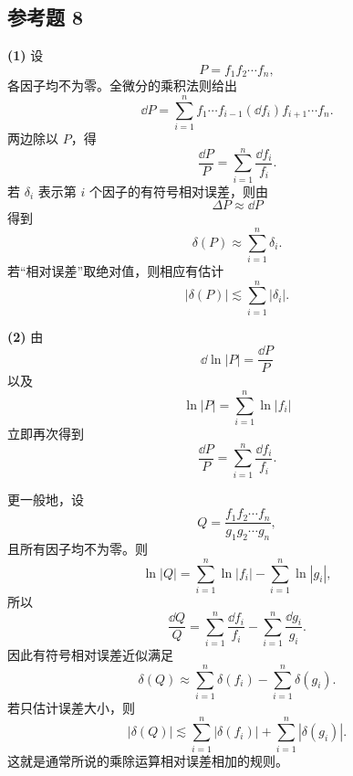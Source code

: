 \subsection*{参考题 8}
\begin{xsolution}
\textbf{(1)} 设
\[
  P=f_1f_2\cdots f_n,
\]
各因子均不为零。全微分的乘积法则给出
\[
  \dd P
  =\sum_{i=1}^n
    f_1\cdots f_{i-1}(\dd f_i)f_{i+1}\cdots f_n.
\]
两边除以 $P$，得
\[
  \frac{\dd P}{P}
  =\sum_{i=1}^n\frac{\dd f_i}{f_i}.
\]
若 $\delta_i$ 表示第 $i$ 个因子的有符号相对误差，则由
\[
  \Delta P\approx\dd P
\]
得到
\[
  \boxed{
  \delta(P)\approx\sum_{i=1}^n\delta_i}.
\]
若“相对误差”取绝对值，则相应有估计
\[
  |\delta(P)|\lesssim\sum_{i=1}^n|\delta_i|.
\]

\textbf{(2)} 由
\[
  \dd\ln|P|=\frac{\dd P}{P}
\]
以及
\[
  \ln|P|=\sum_{i=1}^n\ln|f_i|
\]
立即再次得到
\[
  \frac{\dd P}{P}=\sum_{i=1}^n\frac{\dd f_i}{f_i}.
\]

更一般地，设
\[
  Q=\frac{f_1f_2\cdots f_n}{g_1g_2\cdots g_n},
\]
且所有因子均不为零。则
\[
  \ln|Q|
  =\sum_{i=1}^n\ln|f_i|-
    \sum_{i=1}^n\ln|g_i|,
\]
所以
\[
  \frac{\dd Q}{Q}
  =\sum_{i=1}^n\frac{\dd f_i}{f_i}
   -\sum_{i=1}^n\frac{\dd g_i}{g_i}.
\]
因此有符号相对误差近似满足
\[
  \boxed{
  \delta(Q)
  \approx\sum_{i=1}^n\delta(f_i)
  -\sum_{i=1}^n\delta(g_i)}.
\]
若只估计误差大小，则
\[
  \boxed{
  |\delta(Q)|
  \lesssim\sum_{i=1}^n|\delta(f_i)|
  +\sum_{i=1}^n|\delta(g_i)|}.
\]
这就是通常所说的乘除运算相对误差相加的规则。
\end{xsolution}

